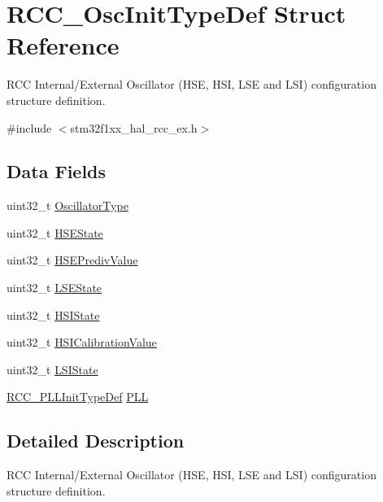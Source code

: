 \hypertarget{struct_r_c_c___osc_init_type_def}{}\section{R\+C\+C\+\_\+\+Osc\+Init\+Type\+Def Struct Reference}
\label{struct_r_c_c___osc_init_type_def}


R\+CC Internal/\+External Oscillator (H\+SE, H\+SI, L\+SE and L\+SI) configuration structure definition.  




{\ttfamily \#include $<$stm32f1xx\+\_\+hal\+\_\+rcc\+\_\+ex.\+h$>$}

\subsection*{Data Fields}
\begin{DoxyCompactItemize}
\item 
uint32\+\_\+t \hyperlink{struct_r_c_c___osc_init_type_def_a23b9d1da2a92936c618d2416406275a3}{Oscillator\+Type}
\item 
uint32\+\_\+t \hyperlink{struct_r_c_c___osc_init_type_def_ad499b1bbeeb8096235b534a9bfa53c9d}{H\+S\+E\+State}
\item 
uint32\+\_\+t \hyperlink{struct_r_c_c___osc_init_type_def_a92007c1d01624a71cb277bf05b8d9a14}{H\+S\+E\+Prediv\+Value}
\item 
uint32\+\_\+t \hyperlink{struct_r_c_c___osc_init_type_def_abb72dd5bfb99667e36d99b6887f80a0a}{L\+S\+E\+State}
\item 
uint32\+\_\+t \hyperlink{struct_r_c_c___osc_init_type_def_a49183e0be5cf522de0fa1968df0bf0d7}{H\+S\+I\+State}
\item 
uint32\+\_\+t \hyperlink{struct_r_c_c___osc_init_type_def_ad28b977e258a3ee788cd6c2d72430c30}{H\+S\+I\+Calibration\+Value}
\item 
uint32\+\_\+t \hyperlink{struct_r_c_c___osc_init_type_def_a9acc15f6278f950ef02d5d6f819f68e8}{L\+S\+I\+State}
\item 
\hyperlink{struct_r_c_c___p_l_l_init_type_def}{R\+C\+C\+\_\+\+P\+L\+L\+Init\+Type\+Def} \hyperlink{struct_r_c_c___osc_init_type_def_a7ec4025786fa81e2a4bfc42832c0eddf}{P\+LL}
\end{DoxyCompactItemize}


\subsection{Detailed Description}
R\+CC Internal/\+External Oscillator (H\+SE, H\+SI, L\+SE and L\+SI) configuration structure definition. 

